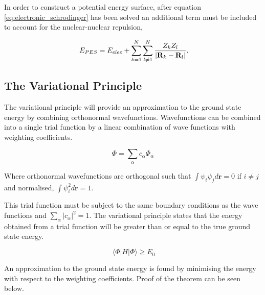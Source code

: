 In order to construct a potential energy surface, after equation \ref{eq:electronic_schrodinger} has been solved an additional term must be included to account for the nuclear-nuclear repulsion,

\begin{equation}
\ E_{PES} = E_{elec} + \sum^N_{k=1} \sum^N_{l\neq 1} \frac{Z_{k}Z_{l}}{|\mathbf{R}_k - \mathbf{R}_l |} \\.
\end{equation}


\subsection{The Variational Principle} \label{sec:variational}

The variational principle will provide an approximation to the ground state energy by combining orthonormal wavefunctions.  Wavefunctions can be combined into a single trial function by a linear combination of wave functions with weighting coefficients.

\begin{equation}
\Phi=\sum_{\alpha} c_{\alpha} \Phi_{\alpha}
\end{equation}

Where orthonormal wavefunctions are orthogonal such that $\int \psi_{i} \psi_{j} d \mathbf{r} = 0$ if $i\neq j$ and normalised, $\int \psi_{i}^2 d \mathbf{r} =1$.

This trial function must be subject to the same boundary conditions as the wave functions and $\sum_{\alpha}|c_{\alpha}|^2=1$.  The variational principle states that the energy obtained from a trial function will be greater than or equal to the true ground state energy\cite{levine_quantum}.

\begin{equation}
\ \langle \Phi | H | \Phi \rangle \ge E_0
\end{equation}

An approximation to the ground state energy is found by minimising the energy with respect to the weighting coefficients.  Proof of the theorem can be seen below\cite{Szabo_quantum}.

